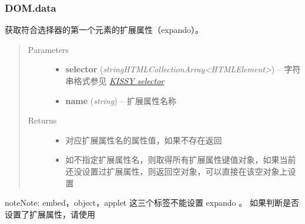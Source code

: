 \documentclass[letterpaper,10pt,english]{sphinxmanual}
\begin{document}
\subsubsection{DOM.data}
\label{api/core/dom/data:dom-data}\label{api/core/dom/data::doc}

\begin{fulllineitems}
\label{api/core/dom/data:DOM.data}
获取符合选择器的第一个元素的扩展属性（expando）。
\begin{quote}\begin{description}
\item[{Parameters}] \leavevmode\begin{itemize}
\item {}
\textbf{selector} (\emph{string\textbar{}HTMLCollection\textbar{}Array\textless{}HTMLElement\textgreater{}}) -- 字符串格式参见 {\hyperref[api/core/dom/selector:dom-selector]{\emph{KISSY selector}}}

\item {}
\textbf{name} (\emph{string}) -- 扩展属性名称

\end{itemize}

\item[{Returns}] \leavevmode
\begin{itemize}
\item {}
对应扩展属性名的属性值，如果不存在返回 

\item {}
如不指定扩展属性名，则取得所有扩展属性键值对象，如果当前还没设置过扩展属性，则返回空对象，可以直接在该空对象上设置

\end{itemize}


\end{description}\end{quote}

\end{fulllineitems}


\begin{notice}{note}{Note:}
embed，object，applet 这三个标签不能设置 expando 。
如果判断是否设置了扩展属性，请使用 {\hyperref[api/core/dom/hasData:DOM.hasData]{}}
\end{notice}

\end{document}
